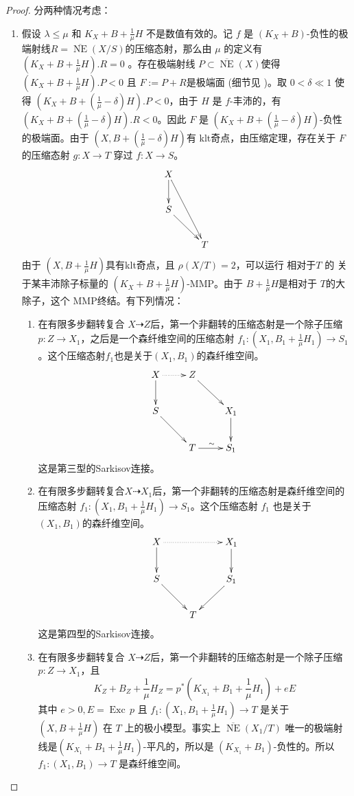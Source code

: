 \begin{proof}
  分两种情况考虑：
  \begin{enumerate}
    \item 假设 $\lambda\leqslant \mu$ 和  $ K_X+B+\frac{1}{\mu}H $ 不是数值有效的。记 $ f $ 是 $ (K_X+B) $-负性的极端射线$ R= \overline{\operatorname{ NE }}(X/S) $的压缩态射，那么由 $\mu$ 的定义有$ (K_X+B+\frac{1}{\mu}H).R=0 $ 。存在极端射线 $ P \subset \overline{\operatorname{ NE }}(X) $使得$ (K_X+B+\frac{1}{\mu}H).P<0 $ 且 $ F:=P+R $是极端面  (细节见 \cite [5.4.2]{cortiFactoringBirationalMaps} )。取  $ 0<\delta\ll 1 $ 使得 $ (K_X+B+(\frac{1}{\mu}-\delta)H).P<0 $，由于  $H$ 是 $f$-丰沛的，有 $  (K_X+B+(\frac{1}{\mu}-\delta)H).R<0 $。因此 $ F $ 是 $  (K_X+B+(\frac{1}{\mu}-\delta)H) $-负性的极端面。由于 $ (X,B+(\frac{1}{\mu}-\delta)H) $有 klt奇点，由压缩定理，存在关于 $F$ 的压缩态射 $ g:X\to T $  穿过 $ f:X\to S $。
  \[ \xymatrix{
      X\ar[d]\ar[rdd]& \\
      S\ar[rd]&\\
         &T } \]
      由于  $ (X,B+\frac{1}{\mu}H) $具有klt奇点，且 $ \rho(X/T)=2 $，可以运行 相对于$T$ 的 关于某丰沛除子标量的 $ (K_X+B+\frac{1}{\mu}H) $-MMP。由于 $ B+\frac{1}{\mu}H $是相对于 $T$的大除子，这个 MMP终结。有下列情况：
    \begin{enumerate}
      \item 在有限多步翻转复合 $ X\dashrightarrow Z $后，第一个非翻转的压缩态射是一个除子压缩 $ p:Z\to X_1 $，之后是一个森纤维空间的压缩态射 $f_{1}:(X_{1},B_{1}+\frac{1}{\mu}H_{1})\to S_1$。这个压缩态射$f_1$也是关于$(X_{1},B_{1})$的森纤维空间。
      \[ \xymatrix{
          X\ar@{.>}[r]\ar[d]& Z\ar[rd] \\
          S\ar[rd]& & X_{1}\ar[d]\\
               &T\ar[r]^{\sim}& S_{1} } \]
      这是第三型的Sarkisov连接。
      \item 在有限多步翻转复合$ X\dashrightarrow X_1 $后，第一个非翻转的压缩态射是森纤维空间的压缩态射 $ f_1:(X_1,B_1+\frac{1}{\mu}H_1)\to S_{1} $。这个压缩态射 $f_1$ 也是关于 $(X_{1},B_{1})$的森纤维空间。
      \[ \xymatrix{
          X\ar@{.>}[rr]\ar[d]& &X_{1}\ar[d] \\
          S\ar[rd]& & S_{1}\ar[ld]\\
             &T& } \]
        这是第四型的Sarkisov连接。
      \item 在有限多步翻转复合 $ X\dashrightarrow Z $后，第一个非翻转的压缩态射是一个除子压缩 $ p:Z\to X_1 $，且
            \[ K_Z+B_Z+\frac{1}{\mu}H_Z=p^*(K_{X_1}+B_1+\frac{1}{\mu}H_1)+eE \]
            其中 $ e>0 ,E=\operatorname{Exc}\,p$ 且  $f_{1}: (X_1,B_1+\frac{1}{\mu}H_1) \to T$ 是关于 $(X,B+\frac{1}{\mu}H)$ 在 $T$ 上的极小模型。事实上  $ \overline{\operatorname{NE}}(X_1/T) $ 唯一的极端射线是$ (K_{X_1}+B_1+\frac{1}{\mu}H_1) $-平凡的，所以是 $ (K_{X_1}+B_1) $-负性的。所以 $ f_1:(X_1, B_1)\to T $ 是森纤维空间。

\end{enumerate}
\end{enumerate}
\end{proof}
